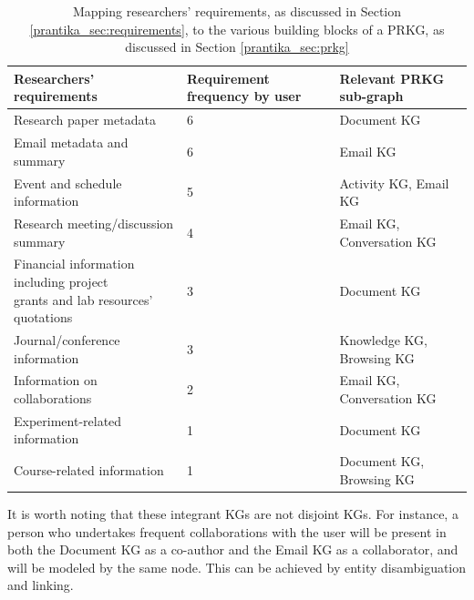 \documentclass[11pt,pdftex]{article}
\begin{document}
\begin{itemize}
\end{itemize}

\begin{table}
    \centering
\caption{Mapping researchers' requirements, as discussed in Section \ref{prantika_sec:requirements}, to the various building blocks of a PRKG, as discussed in Section \ref{prantika_sec:prkg}}
\label{tab:requirements_PRKG}
    \begin{tabular}{l l l} \hline 
         \textbf{Researchers' requirements}& \textbf{Requirement frequency by user}& \textbf{Relevant PRKG sub-graph}\\ \hline 
         Research paper metadata& 6& Document KG\\
         Email metadata and summary& 6 & Email KG\\ 
         Event and schedule information& 5 & Activity KG, Email KG\\ 
         Research meeting/discussion summary & 4 & Email KG, Conversation KG\\ 
         \makecell[l]{Financial information including project \\  grants and lab resources' quotations}& 3 & Document KG\\ 
         Journal/conference information& 3 & Knowledge KG, Browsing KG\\ 
         Information on collaborations & 2 &  Email KG, Conversation KG\\
         Experiment-related information & 1 & Document KG \\
         Course-related information &1 & Document KG, Browsing KG \\ \hline
    \end{tabular}
    
    
\end{table}

It is worth noting that these integrant KGs are not disjoint KGs. For instance, a person who undertakes frequent collaborations with the user will be present in both the Document KG as a co-author and the Email KG as a collaborator, and will be modeled by the same node. This can be achieved by entity disambiguation and linking.
\end{document}
